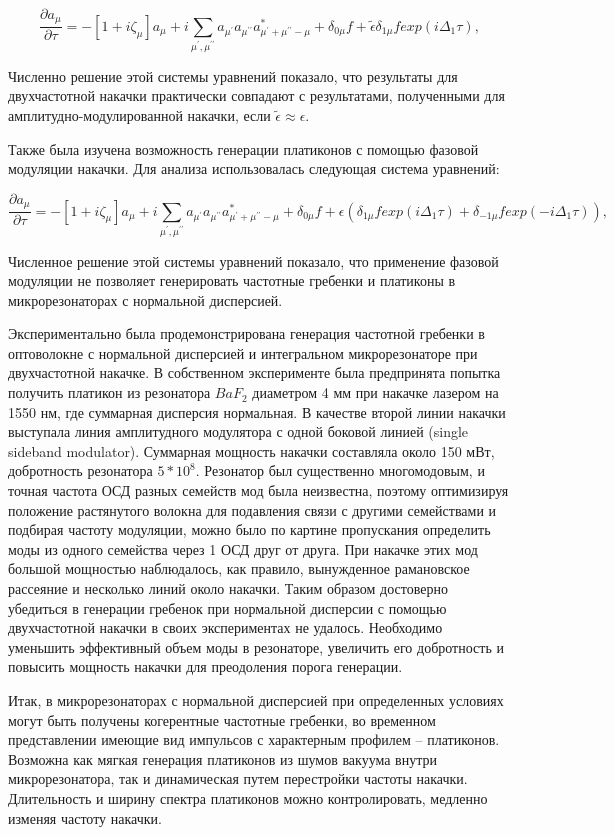 \begin{equation}
\frac{\partial a_\mu}{\partial \tau}=-[1+i\zeta_{\mu}]a_\mu+i\sum_{\mu^\prime,\mu^{\prime\prime}} a_{\mu^\prime}a_{\mu^{\prime\prime}}a_{\mu^\prime+\mu^{\prime\prime}-\mu}^*+\delta_{0\mu}f+\tilde{\epsilon}\delta_{1\mu}f exp(i\Delta_1\tau),
\end{equation}

Численно решение этой системы уравнений показало, что результаты для двухчастотной накачки практически совпадают с результатами, полученными для амплитудно-модулированной накачки, если $\tilde{\epsilon}\approx\epsilon$.

Также была изучена возможность генерации платиконов с помощью фазовой модуляции накачки. Для анализа использовалась
следующая система уравнений:

\begin{equation}
\frac{\partial a_\mu}{\partial \tau}=-[1+i\zeta_{\mu}]a_\mu+i\sum_{\mu^\prime,\mu^{\prime\prime}} a_{\mu^\prime}a_{\mu^{\prime\prime}}a_{\mu^\prime+\mu^{\prime\prime}-\mu}^*+\delta_{0\mu}f+\epsilon(\delta_{1\mu}f exp(i\Delta_1\tau)+\delta_{-1\mu}f exp(-i\Delta_1\tau)),
\end{equation}

Численное решение этой системы уравнений показало, что применение фазовой модуляции не позволяет генерировать частотные гребенки и платиконы в микрорезонаторах с нормальной дисперсией.

Экспериментально была продемонстрирована генерация частотной гребенки в оптоволокне с нормальной дисперсией \cite{Antikainen2015} и интегральном микрорезонаторе \cite{Liu:17} при двухчастотной накачке. В собственном эксперименте была предпринята попытка получить платикон из резонатора $BaF_2$ диаметром 4 мм при накачке лазером на 1550 нм, где суммарная дисперсия нормальная. В качестве второй линии накачки выступала линия амплитудного модулятора с одной боковой линией (single sideband modulator). Суммарная мощность накачки составляла около 150 мВт, добротность резонатора $5*10^8$. Резонатор был существенно многомодовым, и точная частота ОСД разных семейств мод была неизвестна, поэтому оптимизируя положение растянутого волокна для подавления связи с другими семействами и подбирая частоту модуляции, можно было по картине пропускания определить моды из одного семейства через 1 ОСД друг от друга. При накачке этих мод большой мощностью наблюдалось, как правило, вынужденное рамановское рассеяние и несколько линий около накачки. Таким образом достоверно убедиться в генерации гребенок при нормальной дисперсии с помощью двухчастотной накачки в своих экспериментах не удалось. Необходимо уменьшить эффективный объем моды в резонаторе, увеличить его добротность и повысить мощность накачки для преодоления порога генерации.

Итак, в микрорезонаторах с нормальной дисперсией при определенных условиях могут быть получены когерентные частотные гребенки, во временном представлении имеющие вид импульсов с характерным профилем – платиконов. Возможна как мягкая генерация платиконов из шумов вакуума внутри микрорезонатора, так и динамическая путем перестройки частоты накачки. Длительность и ширину спектра платиконов можно контролировать, медленно изменяя частоту накачки.
